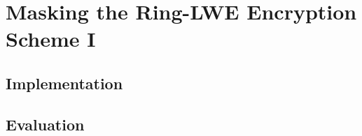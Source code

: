 %
%

\chapter{Masking the Ring-LWE Encryption Scheme I}

\section{Implementation}

\section{Evaluation}